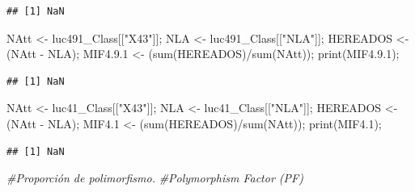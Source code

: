 \documentclass[
]{article}
\newenvironment{Shaded}{\begin{snugshade}}{\end{snugshade}}
\newcommand{\CommentTok}[1]{\textcolor[rgb]{0.56,0.35,0.01}{\textit{#1}}}
\newcommand{\FloatTok}[1]{\textcolor[rgb]{0.00,0.00,0.81}{#1}}
\newcommand{\FunctionTok}[1]{\textcolor[rgb]{0.00,0.00,0.00}{#1}}
\newcommand{\NormalTok}[1]{#1}
\newcommand{\OtherTok}[1]{\textcolor[rgb]{0.56,0.35,0.01}{#1}}
\newcommand{\SpecialCharTok}[1]{\textcolor[rgb]{0.00,0.00,0.00}{#1}}
\newcommand{\StringTok}[1]{\textcolor[rgb]{0.31,0.60,0.02}{#1}}
\begin{document}
\begin{verbatim}
## [1] NaN
\end{verbatim}

\begin{Shaded}
\begin{Highlighting}[]
\NormalTok{NAtt }\OtherTok{\textless{}{-}}\NormalTok{ luc491\_Class[[}\StringTok{"X43"}\NormalTok{]];}
\NormalTok{NLA }\OtherTok{\textless{}{-}}\NormalTok{ luc491\_Class[[}\StringTok{"NLA"}\NormalTok{]];}
\NormalTok{HEREADOS }\OtherTok{\textless{}{-}}\NormalTok{ (NAtt }\SpecialCharTok{{-}}\NormalTok{ NLA);}
\NormalTok{MIF4.}\FloatTok{9.1} \OtherTok{\textless{}{-}}\NormalTok{ (}\FunctionTok{sum}\NormalTok{(HEREADOS)}\SpecialCharTok{/}\FunctionTok{sum}\NormalTok{(NAtt));}
\FunctionTok{print}\NormalTok{(MIF4.}\FloatTok{9.1}\NormalTok{);}
\end{Highlighting}
\end{Shaded}

\begin{verbatim}
## [1] NaN
\end{verbatim}

\begin{Shaded}
\begin{Highlighting}[]
\NormalTok{NAtt }\OtherTok{\textless{}{-}}\NormalTok{ luc41\_Class[[}\StringTok{"X43"}\NormalTok{]];}
\NormalTok{NLA }\OtherTok{\textless{}{-}}\NormalTok{ luc41\_Class[[}\StringTok{"NLA"}\NormalTok{]];}
\NormalTok{HEREADOS }\OtherTok{\textless{}{-}}\NormalTok{ (NAtt }\SpecialCharTok{{-}}\NormalTok{ NLA);}
\NormalTok{MIF4}\FloatTok{.1} \OtherTok{\textless{}{-}}\NormalTok{ (}\FunctionTok{sum}\NormalTok{(HEREADOS)}\SpecialCharTok{/}\FunctionTok{sum}\NormalTok{(NAtt));}
\FunctionTok{print}\NormalTok{(MIF4}\FloatTok{.1}\NormalTok{);}
\end{Highlighting}
\end{Shaded}

\begin{verbatim}
## [1] NaN
\end{verbatim}

\begin{Shaded}
\begin{Highlighting}[]
\CommentTok{\#Proporción de polimorfismo.}
\CommentTok{\#Polymorphism Factor (PF)}
\end{Highlighting}
\end{Shaded}
\end{document}
